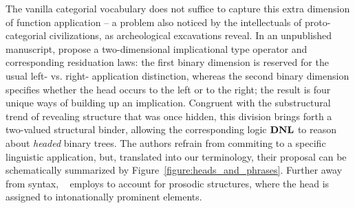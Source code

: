 The vanilla categorial vocabulary does not suffice to capture this extra dimension of function application -- a problem also noticed by the intellectuals of proto-categorial civilizations, as archeological excavations reveal.
In an unpublished manuscript, \citet{moortgat1991heads} propose a two-dimensional implicational type operator and corresponding residuation laws: the first binary dimension is reserved for the usual left- vs. right- application distinction, whereas the second binary dimension specifies whether the head occurs to the left or to the right; the result is four unique ways of building up an implication.
Congruent with the substructural trend of revealing structure that was once hidden, this division brings forth a two-valued structural binder, allowing the corresponding logic $\textbf{DNL}$ to reason about \textit{headed} binary trees.
The authors refrain from commiting to a specific linguistic application, but, translated into our terminology, their proposal can be schematically summarized by Figure~\ref{figure:heads_and_phrases}.
Further away from syntax, ~\citet{hendriks1997logic} employs  to account for prosodic structures, where the head is assigned to intonationally prominent elements.

